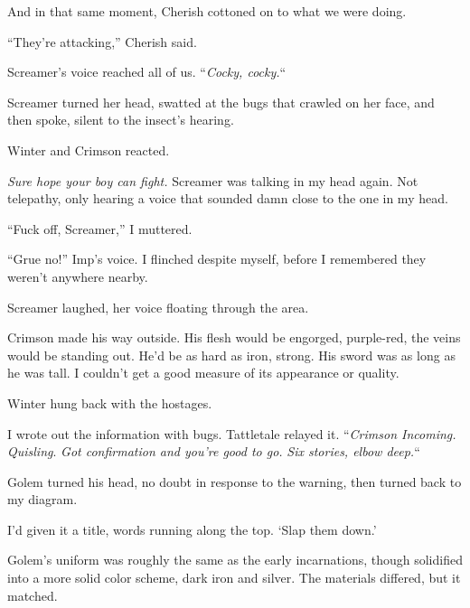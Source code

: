 And in that same moment, Cherish cottoned on to what we were doing.



``They're attacking,'' Cherish said.



Screamer's voice reached all of us.  ``\emph{Cocky, cocky.}``



Screamer turned her head, swatted at the bugs that crawled on her face, and then spoke, silent to the insect's hearing.



Winter and Crimson reacted.



\emph{Sure hope your boy can fight.  }Screamer was talking in my head again.  Not telepathy, only hearing a voice that sounded damn close to the one in my head.



``Fuck off, Screamer,'' I muttered.



``Grue no!'' Imp's voice.  I flinched despite myself, before I remembered they weren't anywhere nearby.



Screamer laughed, her voice floating through the area.



Crimson made his way outside.  His flesh would be engorged, purple-red, the veins would be standing out.  He'd be as hard as iron, strong.  His sword was as long as he was tall.  I couldn't get a good measure of its appearance or quality.



Winter hung back with the hostages.



I wrote out the information with bugs.  Tattletale relayed it.  ``\emph{Crimson Incoming.  Quisling}.  \emph{Got confirmation and you're good to go. }\emph{Six stories, elbow deep.}``



Golem turned his head, no doubt in response to the warning, then turned back to my diagram.



I'd given it a title, words running along the top.  `Slap them down.'



Golem's uniform was roughly the same as the early incarnations, though solidified into a more solid color scheme, dark iron and silver.  The materials differed, but it matched.



